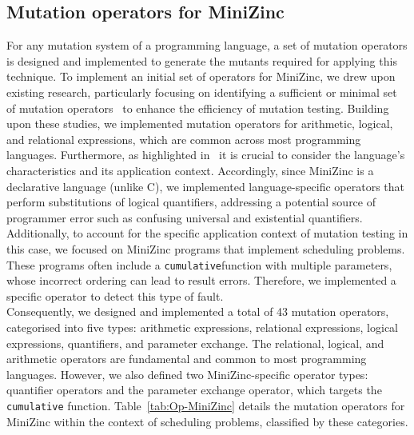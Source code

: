 \subsection{Mutation operators for MiniZinc}

For any mutation system of a programming language, a set of mutation operators is designed and implemented to generate the mutants required for applying this technique. To implement an initial set of operators for MiniZinc, we drew upon existing research, particularly focusing on identifying a sufficient or minimal set of mutation operators~\cite{Offutt96OpMut,Mresa99OpMut,PapadakisM10} to enhance the efficiency of mutation testing. Building upon these studies, we implemented mutation operators for arithmetic, logical, and relational expressions, which are common across most programming languages. Furthermore, as highlighted in~\cite{Mresa99OpMut} it is crucial to consider the language's characteristics and its application context. Accordingly, since MiniZinc is a declarative language (unlike C), we implemented language-specific operators that perform substitutions of logical quantifiers, addressing a potential source of programmer error such as confusing universal and existential quantifiers. Additionally, to account for the specific application context of mutation testing in this case, we focused on MiniZinc programs that implement scheduling problems. These programs often include a \texttt{cumulative}function with multiple parameters, whose incorrect ordering can lead to result errors. Therefore, we implemented a specific operator to detect this type of fault.\\

Consequently, we designed and implemented a total of 43 mutation operators, categorised into five types: arithmetic expressions, relational expressions, logical expressions, quantifiers, and parameter exchange. The relational, logical, and arithmetic operators are fundamental and common to most programming languages. However, we also defined two MiniZinc-specific operator types: quantifier operators and the parameter exchange operator, which targets the \texttt{cumulative} function. Table~\ref{tab:Op-MiniZinc} details the mutation operators for MiniZinc within the context of scheduling problems, classified by these categories.

